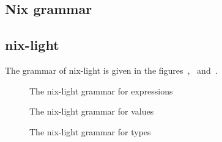 \subsection{Nix grammar}
\label{sec:nix-grammar}


\subsection{nix-light}
\label{sec:nix-light-grammar}

The grammar of nix-light is given in the
figures~,~
and~.

\begin{figure}[h]
  
  \caption{\label{grammar::expressions}The nix-light grammar for expressions}
\end{figure}

\begin{figure}[h]
  
  \caption{\label{grammar::values}The nix-light grammar for values}
\end{figure}

\begin{figure}[h]
  
  \caption{\label{grammar::types}The nix-light grammar for types}
\end{figure}
